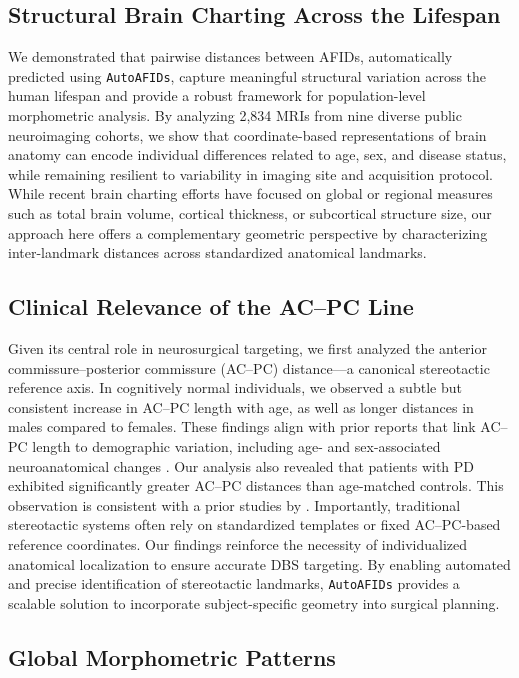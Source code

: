 \subsection{Structural Brain Charting Across the Lifespan}
We demonstrated that pairwise distances between AFIDs, automatically predicted using \texttt{AutoAFIDs}, capture meaningful structural variation across the human lifespan and provide a robust framework for population-level morphometric analysis. By analyzing 2,834 MRIs from nine diverse public neuroimaging cohorts, we show that coordinate-based representations of brain anatomy can encode individual differences related to age, sex, and disease status, while remaining resilient to variability in imaging site and acquisition protocol. While recent brain charting efforts \cite{Bethlehem2022-ow,Di-Biase2023-nv} have focused on global or regional measures such as total brain volume, cortical thickness, or subcortical structure size, our approach here offers a complementary geometric perspective by characterizing inter-landmark distances across standardized anatomical landmarks.

\subsection{Clinical Relevance of the AC–PC Line}
Given its central role in neurosurgical targeting, we first analyzed the anterior commissure–posterior commissure (AC–PC) distance—a canonical stereotactic reference axis. In cognitively normal individuals, we observed a subtle but consistent increase in AC–PC length with age, as well as longer distances in males compared to females. These findings align with prior reports that link AC–PC length to demographic variation, including age- and sex-associated neuroanatomical changes \cite{Lee2008-nd}. Our analysis also revealed that patients with PD exhibited significantly greater AC–PC distances than age-matched controls. This observation is consistent with a prior studies by \cite{Lee2008-nd,Dabadi2020-am}. Importantly, traditional stereotactic systems often rely on standardized templates or fixed AC–PC-based reference coordinates. Our findings reinforce the necessity of individualized anatomical localization to ensure accurate DBS targeting. By enabling automated and precise identification of stereotactic landmarks, \texttt{AutoAFIDs} provides a scalable solution to incorporate subject-specific geometry into surgical planning.

\subsection{Global Morphometric Patterns}

